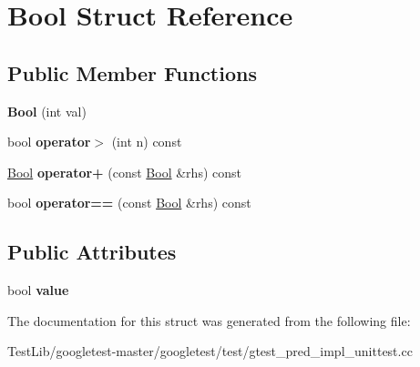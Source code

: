 \hypertarget{structBool}{}\section{Bool Struct Reference}
\label{structBool}
\subsection*{Public Member Functions}
\begin{DoxyCompactItemize}
\item 
\mbox{\label{structBool_a03dfd4851b13abb29414887fcada7fca}} 
{\bfseries Bool} (int val)
\item 
\mbox{\label{structBool_a7baecbc58992eb06157fbbbaa560be0b}} 
bool {\bfseries operator$>$} (int n) const
\item 
\mbox{\label{structBool_a6f4ecdec19082e896cffce66e6b6e7cc}} 
\hyperlink{structBool}{Bool} {\bfseries operator+} (const \hyperlink{structBool}{Bool} \&rhs) const
\item 
\mbox{\label{structBool_afe799a4977c5ebe4c215d5d4ebd77adb}} 
bool {\bfseries operator==} (const \hyperlink{structBool}{Bool} \&rhs) const
\end{DoxyCompactItemize}
\subsection*{Public Attributes}
\begin{DoxyCompactItemize}
\item 
\mbox{\label{structBool_a16be863c269f988cdcbe59f9d846a141}} 
bool {\bfseries value}
\end{DoxyCompactItemize}


The documentation for this struct was generated from the following file\+:\begin{DoxyCompactItemize}
\item 
Test\+Lib/googletest-\/master/googletest/test/gtest\+\_\+pred\+\_\+impl\+\_\+unittest.\+cc\end{DoxyCompactItemize}
